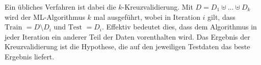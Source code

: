 Ein übliches Verfahren ist dabei die $k$-Kreuzvalidierung. Mit $D = D_1 \uplus ... \uplus D_k$ wird der ML-Algorithmus $k$ mal ausgeführt, wobei in Iteration $i$ gilt, dass $\text{Train } = D \setminus D_i$ und $\text{Test } = D_i$. Effektiv bedeutet dies, dass dem Algorithmus in jeder Iteration ein anderer Teil der Daten vorenthalten wird. Das Ergebnis der Kreuzvalidierung ist die Hypothese, die auf den jeweiligen Testdaten das beste Ergebnis liefert.

